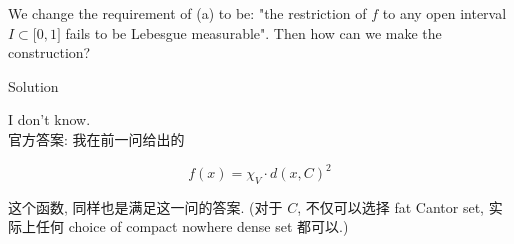 \documentclass{qlnotes-export}
\begin{document}
We change the requirement of (a) to be: "the restriction of \(f\) to any open interval \(I \subset \lbrack 0,1\rbrack\) fails to be Lebesgue measurable". Then how can we make the construction?

\begin{qlsolution}{Solution}

I don't know.\\
官方答案: 我在前一问给出的

\[f(x) = \chi_{V} \cdot d(x,C)^{2}\]

这个函数, 同样也是满足这一问的答案. (对于 \(C\), 不仅可以选择 fat Cantor set, 实际上任何 choice of compact nowhere dense set 都可以.)

\end{qlsolution}
\end{document}
